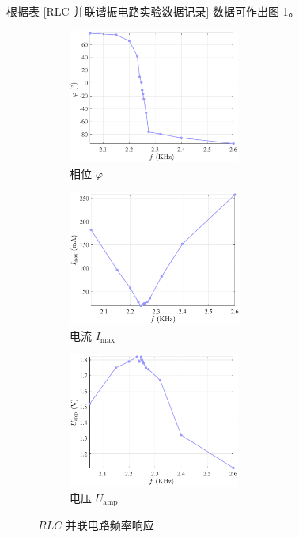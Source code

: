 \documentclass[UTF8]{article}
\theoremstyle{MyLineTheoremStyle} %
\theoremstyle{MyBlockTheoremStyle} %
\theoremstyle{MySubsubsectionStyle} %
\begin{document}
根据表 \ref{RLC 并联谐振电路实验数据记录} 数据可作出图 \ref{RLC 并联电路频率响应}。
\begin{figure}[H]\centering
\begin{subfigure}[b]{0.33\columnwidth}\centering
    \includegraphics[height=125pt]{assets/2/2024-12-24_22-29-02.pdf}
    \caption{相位 $\varphi$}
\end{subfigure}\hfill
\begin{subfigure}[b]{0.33\columnwidth}\centering
    \includegraphics[height=125pt]{assets/2/2024-12-24_22-29-05.pdf}
    \caption{电流 $I_{\max}$}
\end{subfigure}
\begin{subfigure}[b]{0.33\columnwidth}\centering
    \includegraphics[height=125pt]{assets/2/2024-12-24_22-29-08.pdf}
    \caption{电压 $U_{\text{amp}}$}
\end{subfigure}
\caption{$RLC$ 并联电路频率响应}
\label{RLC 并联电路频率响应}
\end{figure}
\end{document}
